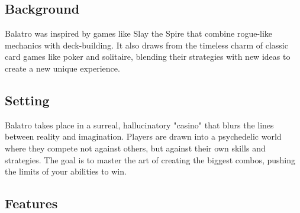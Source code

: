 \documentclass[a4paper,10pt,english]{article}
\begin{document}
\subsection*{Background}

Balatro was inspired by games like Slay the Spire that combine rogue-like mechanics with deck-building. It also draws from the timeless charm of classic card games like poker and solitaire, blending their strategies with new ideas to create a new unique experience.

\subsection*{Setting}

Balatro takes place in a surreal, hallucinatory "casino" that blurs the lines between reality and imagination. Players are drawn into a psychedelic world where they compete not against others, but against their own skills and strategies. The goal is to master the art of creating the biggest combos, pushing the limits of your abilities to win.

\subsection*{Features}
\end{document}
